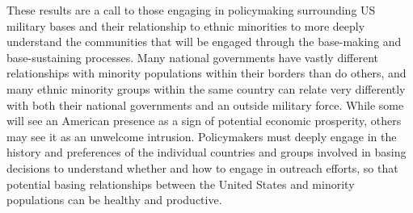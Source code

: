 These results are a call to those engaging in policymaking surrounding US military bases and their relationship to ethnic minorities to more deeply understand the communities that will be engaged through the base-making and base-sustaining processes. Many national governments have vastly different relationships with minority populations within their borders than do others, and many ethnic minority groups within the same country can relate very differently with both their national governments and an outside military force. While some will see an American presence as a sign of potential economic prosperity, others may see it as an unwelcome intrusion. Policymakers must deeply engage in the history and preferences of the individual countries and groups involved in basing decisions to understand whether and how to engage in outreach efforts, so that potential basing relationships between the United States and minority populations can be healthy and productive.